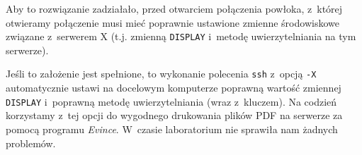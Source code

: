 \documentclass[a4paper,11pt]{article}
\begin{document}
Aby to rozwiązanie zadziałało, przed otwarciem połączenia \ssh{} powłoka,
z~której otwieramy połączenie musi mieć poprawnie ustawione zmienne środowiskowe
związane z~serwerem X (t.j. zmienną \texttt{DISPLAY} i~metodę uwierzytelniania
na tym serwerze).

Jeśli to założenie jest spełnione, to wykonanie polecenia \texttt{ssh} z~opcją
\texttt{-X} automatycznie ustawi na docelowym komputerze poprawną wartość
zmiennej \texttt{DISPLAY} i~poprawną metodę uwierzytelniania (wraz z~kluczem).
Na codzień korzystamy z~tej opcji do wygodnego drukowania plików PDF na serwerze
\volt{} za pomocą programu \emph{Evince}. W~czasie laboratorium nie sprawiła nam
żadnych problemów.




\end{document}
